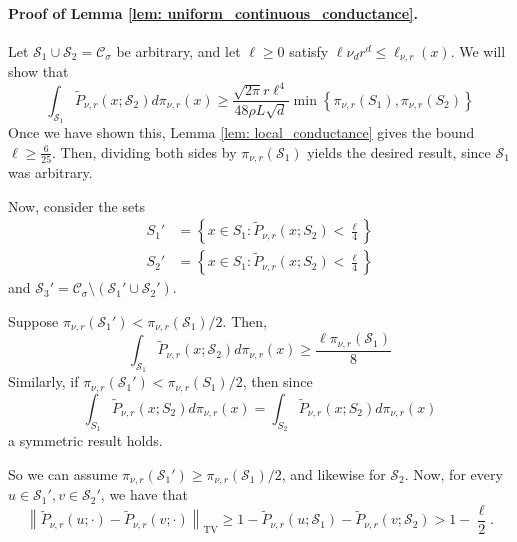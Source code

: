 \documentclass[11pt,twoside]{article}
\newcommand{\set}[1]{\left\{#1\right\}}
\newcommand{\norm}[1]{\left\lVert#1\right\rVert}
\newcommand{\1}{\mathbf{1}}
\newcommand{\Sset}{\mathcal{S}}
\newcommand{\Cset}{\mathcal{C}}
\newcommand{\Csig}{\Cset_{\sigma}}
\begin{document}
\paragraph{Proof of Lemma \ref{lem: uniform_continuous_conductance}.}
Let $\Sset_1 \cup \Sset_2 = \Csig$ be arbitrary, and let $\ell \geq 0$ satisfy $\ell \nu_d r^d  \leq \ell_{\nu,r}(x)$. We will show that 
\begin{equation*}
\int_{\Sset_1} \widetilde{P}_{\nu,r}(x; \Sset_2) d \pi_{\nu,r}(x) \geq \frac{\sqrt{2 \pi} r \ell^4}{48 \rho L \sqrt{d}} \min\set{\pi_{\nu,r}(S_1), \pi_{\nu,r}(S_2)}
\end{equation*}
Once we have shown this, Lemma \ref{lem: local_conductance} gives the bound $\ell \geq \frac{6}{25}$. Then, dividing both sides by $\pi_{\nu,r}(\Sset_1)$ yields the desired result, since $\Sset_1$ was arbitrary.

Now, consider the sets
\begin{align*}
S_1' & = \set{x \in S_1: \widetilde{P}_{\nu,r}(x; S_2) < \frac{\ell}{4}} \\
S_2' & = \set{x \in S_1: \widetilde{P}_{\nu,r}(x; S_2) < \frac{\ell}{4}}
\end{align*}
and $\Sset_3' = \Csig \setminus (\Sset_1' \cup \Sset_2')$. 

Suppose $\pi_{\nu,r}(\Sset_1') < \pi_{\nu,r}(\Sset_1)/2$. Then,
\begin{equation*}
\int_{\Sset_1} \widetilde{P}_{\nu,r}(x; \Sset_2) d \pi_{\nu,r}(x) \geq \frac{\ell  \pi_{\nu,r}(\Sset_1)}{8}
\end{equation*}
Similarly, if $\pi_{\nu,r}(\Sset_1') < \pi_{\nu,r}(S_1)/2$, then since
\begin{equation*}
\int_{S_1} \widetilde{P}_{\nu,r}(x; S_2) d \pi_{\nu,r}(x) = \int_{S_2} \widetilde{P}_{\nu,r}(x; S_2) d \pi_{\nu,r}(x)
\end{equation*}
a symmetric result holds.

So we can assume $\pi_{\nu,r}(\Sset_1') \geq \pi_{\nu,r}(\Sset_1)/2$, and likewise for $\Sset_2$. Now, for every $u \in \Sset_1', v \in \Sset_2'$, we have that
\begin{equation*}
\norm{\widetilde{P}_{\nu,r}(u;\cdot) - \widetilde{P}_{\nu,r}(v;\cdot)}_{\mathrm{TV}} \geq 1 - \widetilde{P}_{\nu,r}(u;\Sset_1) - \widetilde{P}_{\nu,r}(v;\Sset_2) > 1 - \frac{\ell}{2}.
\end{equation*}
\end{document}
